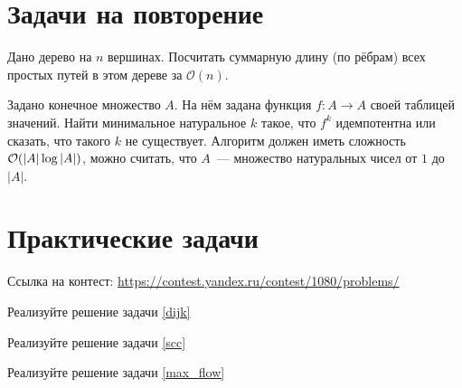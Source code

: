 \documentclass[addpoints]{exam}
\begin{document}
\begin{questions}
\section{Задачи на повторение}

\question[1 \half]  Дано дерево на $n$ вершинах. Посчитать суммарную длину (по рёбрам) всех простых путей в этом дереве за $\mathcal{O}(n)$.

\question[2] Задано конечное множество $A$. На нём задана функция $f: A \to A$ своей таблицей значений. Найти минимальное натуральное $k$ такое, что $f^k$ идемпотентна или сказать, что такого $k$ не существует. Алгоритм должен иметь сложность $\mathcal{O}(|A| \log{|A|})$, можно считать, что $A$~--- множество натуральных чисел от $1$ до $|A|$.

\section{Практические задачи}

Ссылка на контест: \url{https://contest.yandex.ru/contest/1080/problems/}

\question[2] Реализуйте решение задачи \ref{dijk}

\question[2] Реализуйте решение задачи \ref{scc}

\question[2] Реализуйте решение задачи \ref{max_flow}

\begin{center}
\pointtable[h][questions]
\end{center}

\end{questions}
\end{document}
